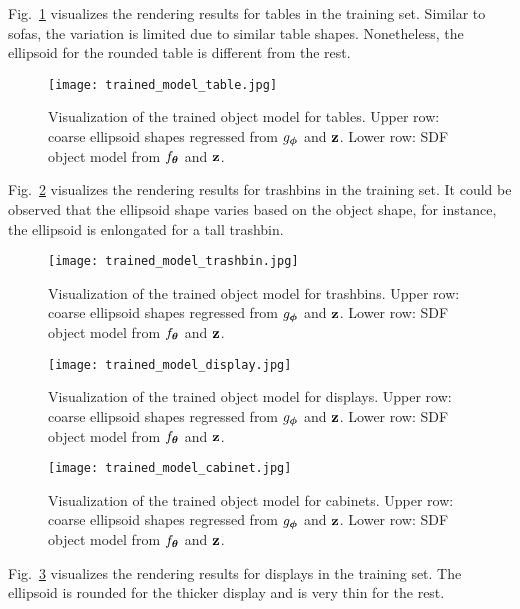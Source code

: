 Fig.~\ref{fig:trained_model_table} visualizes the rendering results for tables in the training set. Similar to sofas, the variation is limited due to similar table shapes. Nonetheless, the ellipsoid for the rounded table is different from the rest. 


\begin{figure}[thp!]
    \centering
    \texttt{[image: trained\_model\_table.jpg]}
    \caption{Visualization of the trained object model for tables. Upper row: coarse ellipsoid shapes regressed from $g_{\boldsymbol{\phi}}$ and $\mathbf{z}$. Lower row: SDF object model from $f_{\boldsymbol{\theta}}$ and $\mathbf{z}$.}
    \label{fig:trained_model_table}
\end{figure}



Fig.~\ref{fig:trained_model_trashbin} visualizes the rendering results for trashbins in the training set. It could be observed that the ellipsoid shape varies based on the object shape, for instance, the ellipsoid is enlongated for a tall trashbin. 


\begin{figure}[thp!]
    \centering
    \texttt{[image: trained\_model\_trashbin.jpg]}
    \caption{Visualization of the trained object model for trashbins. Upper row: coarse ellipsoid shapes regressed from $g_{\boldsymbol{\phi}}$ and $\mathbf{z}$. Lower row: SDF object model from $f_{\boldsymbol{\theta}}$ and $\mathbf{z}$.}
    \label{fig:trained_model_trashbin}
\end{figure}


\begin{figure}[thp!]
    \centering
    \texttt{[image: trained\_model\_display.jpg]}
    \caption{Visualization of the trained object model for displays. Upper row: coarse ellipsoid shapes regressed from $g_{\boldsymbol{\phi}}$ and $\mathbf{z}$. Lower row: SDF object model from $f_{\boldsymbol{\theta}}$ and $\mathbf{z}$.}
    \label{fig:trained_model_display}
\end{figure}

\begin{figure}[thp!]
    \centering
    \texttt{[image: trained\_model\_cabinet.jpg]}
    \caption{Visualization of the trained object model for cabinets. Upper row: coarse ellipsoid shapes regressed from $g_{\boldsymbol{\phi}}$ and $\mathbf{z}$. Lower row: SDF object model from $f_{\boldsymbol{\theta}}$ and $\mathbf{z}$.}
    \label{fig:trained_model_cabinet}
\end{figure}

Fig.~\ref{fig:trained_model_display} visualizes the rendering results for displays in the training set. The ellipsoid is rounded for the thicker display and is very thin for the rest. 

